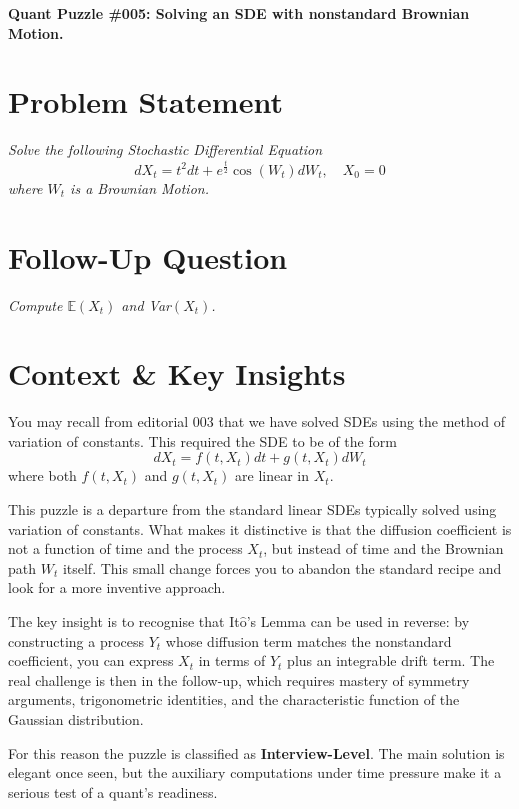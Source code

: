 \documentclass[12pt]{article}
\newcommand{\Itos}{It$\hat{\text{o}}$'s }
\begin{document}
\begin{center}
    \Large \textbf{Quant Puzzle \#005: Solving an SDE with nonstandard Brownian Motion.}
\end{center}

\section*{Problem Statement}
\textit{Solve the following Stochastic Differential Equation}
\[
dX_t = t^2 dt+ e^{\frac{t}{2}}\cos(W_t)dW_t, \quad X_0 = 0
\]
\textit{where \(W_t\) is a Brownian Motion.}
\section*{Follow-Up Question}
\textit{Compute $\mathbb{E}(X_t)$ and Var$(X_t)$.}

\bigskip

\section*{Context \& Key Insights}
You may recall from editorial 003 that we have solved SDEs using the method of variation of constants. This required the SDE to be of the form
\[
dX_t = f(t, X_t)dt + g(t, X_t) dW_t
\]
where both \(f(t, X_t)\) and \(g(t, X_t)\) are linear in \(X_t\).

This puzzle is a departure from the standard linear SDEs typically solved using variation of constants. 
What makes it distinctive is that the diffusion coefficient is not a function of time and the process $X_t$, but instead of time and the Brownian path $W_t$ itself. 
This small change forces you to abandon the standard recipe and look for a more inventive approach. 

The key insight is to recognise that \Itos Lemma can be used in reverse: by constructing a process $Y_t$ whose diffusion term matches the nonstandard coefficient, you can express $X_t$ in terms of $Y_t$ plus an integrable drift term. 
The real challenge is then in the follow-up, which requires mastery of symmetry arguments, trigonometric identities, and the characteristic function of the Gaussian distribution. 

For this reason the puzzle is classified as \textbf{Interview-Level}. The main solution is elegant once seen, but the auxiliary computations under time pressure make it a serious test of a quant’s readiness.
\end{document}
